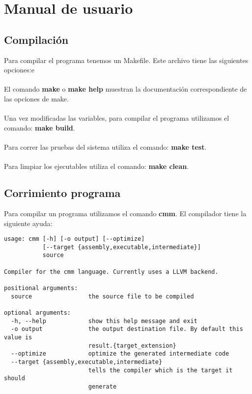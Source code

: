 \documentclass[11pt]{article}
\begin{document}
\pagebreak

\section{Manual de usuario}

\subsection{Compilación}

Para compilar el programa tenemos un Makefile. Este archivo tiene las siguientes opciones:e
\\\\
El comando \textbf{make} o \textbf{make help} muestran la documentación correspondiente de las opciones de make.
\\\\
Una vez modificadas las variables, para compilar el programa utilizamos el comando: \textbf{make build}.
\\\\
Para correr las pruebas del sistema utiliza el comando: \textbf{make test}.
\\\\
Para limpiar los ejecutables utiliza el comando: \textbf{make clean}.

\subsection{Corrimiento programa}

Para compilar un programa utilizamos el comando \textbf{cmm}. El compilador tiene la siguiente ayuda:
 
\begin{verbatim}
usage: cmm [-h] [-o output] [--optimize]
           [--target {assembly,executable,intermediate}]
           source

Compiler for the cmm language. Currently uses a LLVM backend.

positional arguments:
  source                the source file to be compiled

optional arguments:
  -h, --help            show this help message and exit
  -o output             the output destination file. By default this value is
                        result.{target_extension}
  --optimize            optimize the generated intermediate code
  --target {assembly,executable,intermediate}
                        tells the compiler which is the target it should
                        generate
\end{verbatim}
\end{document}
